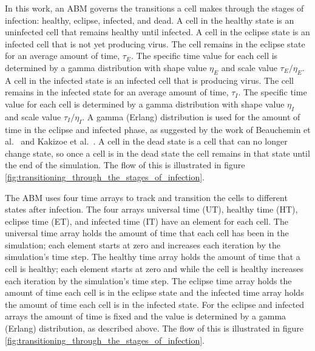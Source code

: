 In this work, an ABM governs the transitions a cell makes through the stages of infection: healthy, eclipse, infected, and dead. A cell in the healthy state is an uninfected cell that remains healthy until infected. A cell in the eclipse state is an infected cell that is not yet producing virus. The cell remains in the eclipse state for an average amount of time, $\tau_E$. The specific time value for each cell is determined by a gamma distribution with shape value $\eta_E$ and scale value $\tau_E/\eta_E$. A cell in the infected state is an infected cell that is producing virus. The cell remains in the infected state for an average amount of time, $\tau_I$. The specific time value for each cell is determined by a gamma distribution with shape value $\eta_I$ and scale value $\tau_I/\eta_I$. A gamma (Erlang) distribution is used for the amount of time in the eclipse and infected phase, as suggested by the work of Beauchemin et al.\ \cite{beauchemin17} and Kakizoe et al.\ \cite{kakizoe15}. A cell in the dead state is a cell that can no longer change state, so once a cell is in the dead state the cell remains in that state until the end of the simulation. The flow of this is illustrated in figure \ref{fig:transitioning_through_the_stages_of_infection}.

The ABM uses four time arrays to track and transition the cells to different states after infection. The four arrays universal time (UT), healthy time (HT), eclipse time (ET), and infected time (IT) have an element for each cell. The universal time array holds the amount of time that each cell has been in the simulation; each element starts at zero and increases each iteration by the simulation's time step. The healthy time array holds the amount of time that a cell is healthy; each element starts at zero and while the cell is healthy increases each iteration by the simulation's time step. The eclipse time array holds the amount of time each cell is in the eclipse state and the infected time array holds the amount of time each cell is in the infected state. For the eclipse and infected arrays the amount of time is fixed and the value is determined by a gamma (Erlang) distribution, as described above. The flow of this is illustrated in figure \ref{fig:transitioning_through_the_stages_of_infection}.


